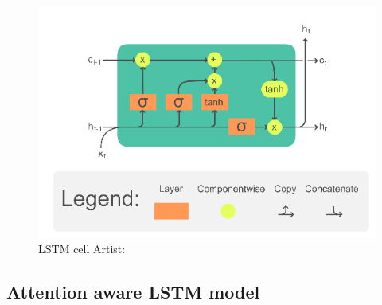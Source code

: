 \begin{figure}[ht]
	\centering
	\includegraphics[width=0.7\linewidth]{figures/LSTM_Cell}
	\caption{LSTM cell  Artist: \textcite{chevalier_english_2018}}
	\label{fig:lstmcell}
\end{figure}

\subsection[ILSTM]{Attention aware LSTM model}

